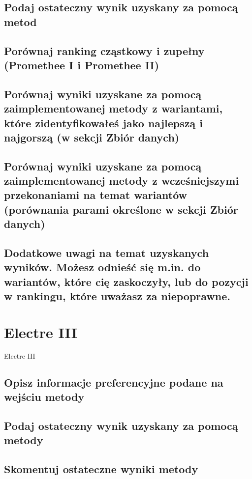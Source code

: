 \documentclass[11pt]{article}
\begin{document}
\subsection{Podaj ostateczny wynik uzyskany za pomocą metod}

\subsection{Porównaj ranking cząstkowy i zupełny (Promethee I i Promethee II)}

\subsection{Porównaj wyniki uzyskane za pomocą zaimplementowanej metody z wariantami, które zidentyfikowałeś jako najlepszą i najgorszą (w sekcji Zbiór danych)}

\subsection{Porównaj wyniki uzyskane za pomocą zaimplementowanej metody z wcześniejszymi przekonaniami na temat wariantów (porównania parami określone w sekcji Zbiór danych)}

\subsection{Dodatkowe uwagi na temat uzyskanych wyników. Możesz odnieść się m.in. do wariantów, które cię zaskoczyły, lub do pozycji w rankingu, które uważasz za niepoprawne.}

\section{Electre III}
Electre III
\subsection{Opisz informacje preferencyjne podane na wejściu metody}

\subsection{Podaj ostateczny wynik uzyskany za pomocą metody}

\subsection{Skomentuj ostateczne wyniki metody}
\end{document}
